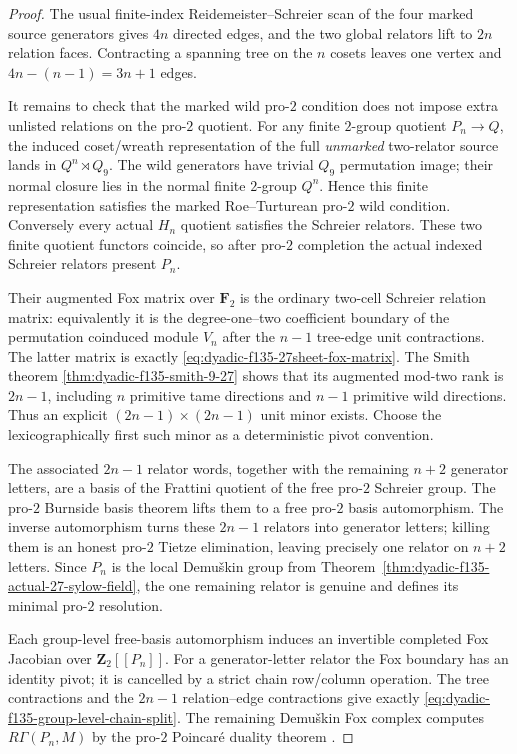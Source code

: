 \begin{proof}
The usual finite-index
Reidemeister--Schreier
scan of the four
marked source
generators gives
$4n$ directed
edges, and the
two global relators
lift to $2n$
relation faces.
Contracting a
spanning tree on
the $n$ cosets
leaves one vertex
and $4n-(n-1)
=3n+1$ edges.

It remains to
check that the
marked wild
pro-$2$ condition
does not impose
extra unlisted
relations on the
pro-$2$ quotient.
For any finite
$2$-group quotient
$P_n\to Q$,
the induced
coset/wreath
representation of
the full
\emph{unmarked}
two-relator source
lands in
$Q^n\rtimes Q_9$.
The wild generators
have trivial
$Q_9$ permutation
image; their
normal closure
lies in the
normal finite
$2$-group
$Q^n$.
Hence this
finite representation
satisfies the
marked Roe--Turturean
pro-$2$ wild
condition.
Conversely every
actual $H_n$
quotient satisfies
the Schreier
relators.
These two finite
quotient functors
coincide, so after
pro-$2$ completion
the actual indexed
Schreier relators
present $P_n$.

Their augmented
Fox matrix over
$\mathbf F_2$
is the ordinary
two-cell
Schreier relation
matrix: equivalently
it is the
degree-one--two
coefficient
boundary of
the permutation
coinduced module
$V_n$ after
the $n-1$
tree-edge unit
contractions.
The latter matrix
is exactly
\eqref{eq:dyadic-f135-27sheet-fox-matrix}.
The Smith theorem
\ref{thm:dyadic-f135-smith-9-27}
shows that its
augmented mod-two
rank is $2n-1$,
including $n$
primitive tame
directions and
$n-1$ primitive
wild directions.
Thus an explicit
$(2n-1)\times(2n-1)$
unit minor exists.
Choose the
lexicographically
first such minor
as a deterministic
pivot convention.

The associated
$2n-1$
relator words,
together with
the remaining
$n+2$ generator
letters, are
a basis of the
Frattini quotient of
the free pro-$2$
Schreier group.
The pro-$2$
Burnside basis
theorem lifts
them to a
free pro-$2$
basis automorphism.
The inverse
automorphism
turns these
$2n-1$ relators
into generator
letters; killing
them is an
honest pro-$2$
Tietze elimination,
leaving precisely
one relator on
$n+2$ letters.
Since $P_n$ is
the local
Demu\v{s}kin group
from
Theorem~\ref{thm:dyadic-f135-actual-27-sylow-field},
the one remaining
relator is genuine
and defines its
minimal pro-$2$
resolution.

Each group-level
free-basis
automorphism
induces an
invertible
completed Fox
Jacobian over
$\mathbf Z_2[[P_n]]$.
For a
generator-letter
relator the
Fox boundary
has an identity
pivot; it is
cancelled by a
strict chain
row/column
operation.
The tree
contractions and
the $2n-1$
relation--edge
contractions give
exactly
\eqref{eq:dyadic-f135-group-level-chain-split}.
The remaining
Demu\v{s}kin
Fox complex
computes
$R\Gamma(P_n,M)$
by the pro-$2$
Poincar\'e
duality theorem
\cite{NSW,LabuteClassification}.


\end{proof}
